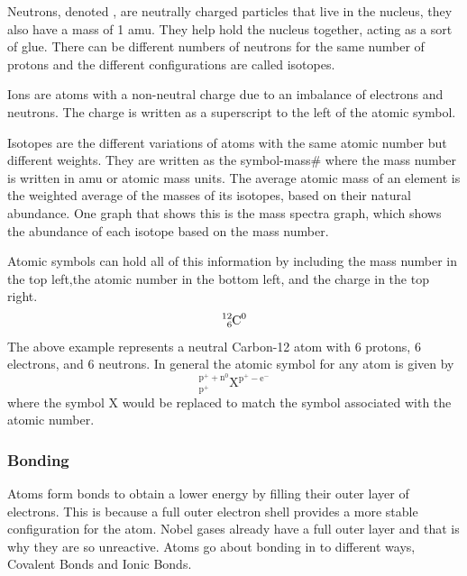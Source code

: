     Neutrons, denoted , are neutrally charged particles that live in the nucleus, they also have a mass of 1 amu. They help hold the nucleus together, acting as a sort of glue. There can be different numbers of neutrons for the same number of protons and the different configurations are called isotopes.

    Ions are atoms with a non-neutral charge due to an imbalance of electrons and neutrons. The charge is written as a superscript to the left of the atomic symbol. 

    Isotopes are the different variations of atoms with the same atomic number but different weights. They are written as the symbol-mass\# where the mass number is written in amu or atomic mass units. The average atomic mass of an element is the weighted average of the masses of its isotopes, based on their natural abundance. One graph that shows this is the mass spectra graph, which shows the abundance of each isotope based on the mass number.

    Atomic symbols can hold all of this information by including the mass number in the top left,the atomic number in the bottom left, and the charge in the top right.
    \[\ce{_6^12C^0}\]
    The above example represents a neutral Carbon-12 atom with 6 protons, 6 electrons, and 6 neutrons. In general the atomic symbol for any atom is given by
    \[_{\text{p}^+}^{\text{p}^+ + \text{n}^0}\text{X}^{\text{p}^+ - \text{e}^-}\]
    where the symbol X would be replaced to match the symbol associated with the atomic number. 

    \subsubsection{Bonding}
    Atoms form bonds to obtain a lower energy by filling their outer layer of electrons. This is because a full outer electron shell provides a more stable configuration for the atom. Nobel gases already have a full outer layer and that is why they are so unreactive. Atoms go about bonding in to different ways, Covalent Bonds and Ionic Bonds.

